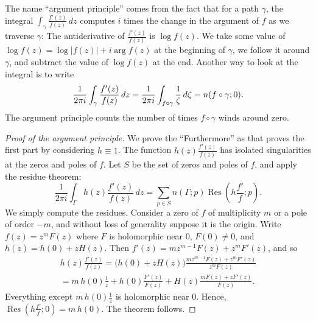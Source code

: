 \documentclass[12pt,openany]{book}
\newcommand{\avoidbreak}{\postdisplaypenalty=100}
\newcommand{\sabs}[1]{\lvert {#1} \rvert}
\newcommand{\myquote}[1]{``#1''}
\theoremstyle{plain}
\theoremstyle{remark}
\theoremstyle{definition}
\theoremstyle{exercise}
\theoremstyle{example}
\begin{document}
The name \myquote{argument principle} comes from the fact that for a path
$\gamma$,
the integral
$\int_{\gamma} \frac{f'(z)}{f(z)} \, dz$
computes $i$ times the change in the argument of $f$ as we traverse $\gamma$:
The antiderivative of
$\frac{f'(z)}{f(z)}$
is $\log f(z)$.
We take some value of $\log f(z) = \log \sabs{f(z)} + i \arg f(z)$
at the beginning of $\gamma$, we follow it
around $\gamma$, and subtract the value of $\log f(z)$ at the end.
Another way to look at the integral is to write
\begin{equation*}
\frac{1}{2\pi i}
\int_{\gamma} \frac{f'(z)}{f(z)} \, dz = 
\frac{1}{2\pi i}
\int_{f \circ \gamma} \frac{1}{\zeta} \, d\zeta 
=
n(f \circ \gamma ; 0 )
.
\avoidbreak
\end{equation*}
The
argument principle counts the number of times 
$f \circ \gamma$ winds around zero.

\begin{proof}[Proof of the argument principle]
We prove the \myquote{Furthermore} as that proves the first part by
considering $h \equiv 1$.
The function $h(z) \frac{f'(z)}{f(z)}$ has isolated singularities
at the zeros and poles of $f$.  Let $S$ be the set of zeros and poles of $f$,
and apply the residue theorem:
\begin{equation*}
\frac{1}{2\pi i}
\int_\Gamma h(z) \frac{f'(z)}{f(z)} \, dz
=
\sum_{p \in S} n(\Gamma;p)\operatorname{Res}\left(h \frac{f'}{f};p\right) .
\end{equation*}
We simply compute the residues.
Consider a zero of $f$ of multiplicity $m$ or a pole of order $-m$, and
without loss of generality suppose it is the origin.
Write $f(z)  = z^m F(z)$ where $F$ is holomorphic near $0$,
$F(0) \not=0$,
and $h(z) = h(0) + z H(z)$.
Then $f'(z) = m z^{m-1} F(z) + z^m F'(z)$, and so
\begin{multline*}
h(z) \frac{f'(z)}{f(z)}
=
\bigl( h(0) + z H(z) \bigr)
\frac{m z^{m-1} F(z) + z^m F'(z)}{z^m F(z)}
\\
=
m\, h(0) 
\frac{1}{z}
+
h(0) 
\frac{F'(z)}{F(z)}
+
H(z)
\frac{m F(z) + z F'(z)}{F(z)} .
\end{multline*}
Everything except $m\, h(0) \frac{1}{z}$ is holomorphic near $0$.
Hence, $\operatorname{Res}\left(h\frac{f'}{f};0\right) = m\, h(0)$.
The theorem follows.
\end{proof}
\end{document}

